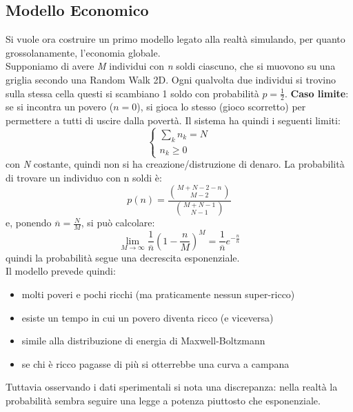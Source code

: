 \documentclass[12pt, a4paper]{article}
\theoremstyle{theorem}
\begin{document}
		\subsection{Modello Economico}
			Si vuole ora costruire un primo modello legato alla realtà simulando, per quanto grossolanamente, l'economia globale.\\
			Supponiamo di avere \textit{M} individui con \textit{n} soldi ciascuno, che si muovono su una griglia secondo una Random Walk 2D.
			Ogni qualvolta due individui si trovino sulla stessa cella questi si scambiano 1 soldo con probabilità $p=\frac{1}{2}$.
			\textbf{Caso limite}: se si incontra un povero ($n=0$), si gioca lo stesso (gioco scorretto) per permettere a tutti di uscire dalla povertà.
			Il sistema ha quindi i seguenti limiti:
			\begin{equation}
				\begin{cases}
					\sum_kn_k=N\\
					n_k\geq 0
				\end{cases}
			\end{equation}
			con \textit{N} costante, quindi non si ha creazione/distruzione di denaro.
			La probabilità di trovare un individuo con n soldi è:
			\begin{equation}
				p(n)=\frac{\binom{M+N-2-n}{M-2}}{\binom{M+N-1}{N-1}}
			\end{equation}
			e, ponendo $\overline{n}=\frac{N}{M}$, si può calcolare:
			\begin{equation}
				\lim_{M\to\infty}\frac{1}{\overline{n}}\left( 1-\frac{n}{M}\right)^M=\frac{1}{\overline{n}}e^{-\frac{n}{\bar{n}}}
			\end{equation}
			quindi la probabilità segue una decrescita esponenziale.\\
			Il modello prevede quindi:
			\begin{itemize}
				\item molti poveri e pochi ricchi (ma praticamente nessun super-ricco)
				\item esiste un tempo in cui un povero diventa ricco (e viceversa)
				\item simile alla distribuzione di energia di Maxwell-Boltzmann
				\item se chi è ricco pagasse di più si otterrebbe una curva a campana
			\end{itemize}
			Tuttavia osservando i dati sperimentali si nota una discrepanza: nella realtà la probabilità sembra seguire una legge a potenza piuttosto che esponenziale.
\end{document}

